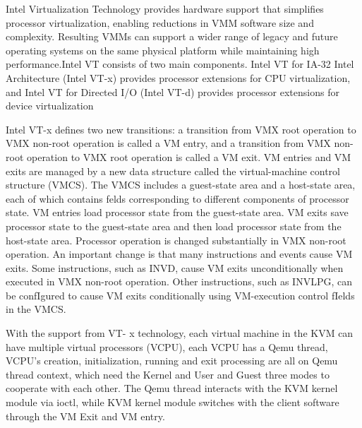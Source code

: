 \documentclass[10pt,draftclsnofoot,peerreview,letterpaper,onecolumn,]{IEEEtran}
\begin{document}
Intel Virtualization Technology provides hardware support that simplifies processor virtualization, enabling reductions in VMM software size and complexity. Resulting VMMs can support a wider range of legacy and future operating systems on the same physical platform while maintaining high performance.Intel VT consists of two main components. Intel VT for IA-32 Intel Architecture (Intel VT-x) provides processor extensions for CPU virtualization, and Intel VT for Directed I/O (Intel VT-d) provides processor extensions for device virtualization

Intel VT-x defines two new transitions: a transition from VMX root operation to VMX non-root operation is called a VM entry, and a transition from VMX non-root operation to VMX root operation is called a VM exit. VM entries and VM exits are managed by a new data structure called the virtual-machine control structure (VMCS). The VMCS includes a guest-state area and a host-state area, each of which contains felds corresponding to different components of processor state. VM entries load processor state from the guest-state area. VM exits save processor state to the guest-state area and then load processor state from the host-state area. Processor operation is changed substantially in VMX non-root operation. An important change is that many instructions and events cause VM exits. Some instructions, such as INVD, cause VM exits unconditionally when executed in VMX non-root operation. Other instructions, such as INVLPG, can be confIgured to cause VM exits conditionally using VM-execution control fIelds in the VMCS.

With the support from VT- x technology, each virtual machine in the KVM can have multiple virtual processors (VCPU), each VCPU has a Qemu thread, VCPU’s creation,  initialization, running and exit processing are all on Qemu thread context, which need the Kernel and User and Guest three modes to cooperate with each other. The Qemu thread interacts with the KVM kernel module via ioctl, while KVM kernel module switches with the client software through the VM Exit and VM entry.
\end{document}
